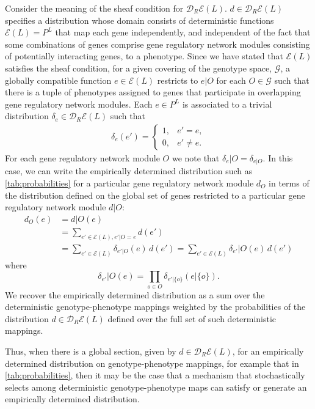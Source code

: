 Consider the meaning of the sheaf condition for $\mathcal{D}_R\mathcal{E}(L)$. $d \in \mathcal{D}_R\mathcal{E}(L)$ specifies a distribution whose domain consists of deterministic functions $\mathcal{E}(L) = P^L$ that map each gene independently, and independent of the fact that some combinations of genes  comprise gene regulatory network modules consisting of potentially interacting genes, to a phenotype. Since we have stated that $\mathcal{E}(L)$ satisfies the sheaf condition, for a given covering of the genotype space, $\mathcal{G}$, a globally compatible function $e \in  \mathcal{E}(L)$ restricts to $e|O$ for each $O \in \mathcal{G}$ such that there is a tuple of phenotypes assigned to genes that participate in overlapping gene regulatory network modules. Each $e \in P^L$ is associated to a trivial distribution $\delta_e \in \mathcal{D}_R\mathcal{E}(L)$ such that
\begin{eqnarray}
\delta_e(e') =
\begin{cases}
1, & e' = e,\\
0, & e' \neq e.
\end{cases}
\end{eqnarray}
For each gene regulatory network module $O$ we note that $\delta_e|O = \delta_{e|O}$. In this case, we can write the empirically determined distribution such as \ref{tab:probabilities} for a particular gene regulatory network module $d_O$ in terms of the distribution defined on the global set of genes restricted to a particular gene regulatory network module $d|O$:
\begin{equation}\label{eq:factordist}
\begin{split}
d_O(e) &= d|O(e)\\
&= \sum_{e' \in \mathcal{E}(L),e'|O=e} d(e')\\
&= \sum_{e' \in \mathcal{E}(L)} \delta_{e'|O}(e) \, d(e') = \sum_{e' \in \mathcal{E}(L)} \delta_{e'}|O(e) \, d(e')
\end{split}
\end{equation}
where
\begin{equation*}
\delta_{e'}|O(e) = \prod_{o \in O} \delta_{e'|\{o\}}(e|\{o\}).
\end{equation*}
We recover the empirically determined distribution as a sum over the deterministic genotype-phenotype mappings weighted by the probabilities of the distribution $d \in \mathcal{D}_R\mathcal{E}(L)$ defined over the full set of such deterministic mappings.

Thus, when there is a global section, given by $d \in \mathcal{D}_R\mathcal{E}(L)$, for an empirically determined distribution on genotype-phenotype mappings, for example that in \ref{tab:probabilities}, then it may be the case that a mechanism that stochastically selects among deterministic genotype-phenotype maps can satisfy or generate an empirically determined distribution.

